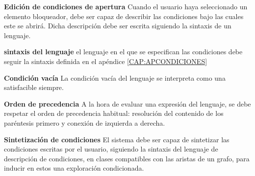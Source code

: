 \item \textbf{Edición de condiciones de apertura}\newline
	Cuando el usuario haya seleccionado un elemento bloqueador, debe ser capaz de describir las condiciones bajo las cuales este se abrirá. Dicha descripción debe ser escrita siguiendo la sintaxis de un lenguaje.
	\begin{functional}
		\item \textbf{sintaxis del lenguaje}\newline
			el lenguaje en el que se especifican las condiciones debe seguir la sintaxis definida en el apéndice \ref{CAP:APCONDICIONES}
		\item \textbf{Condición vacía}\newline
			La condición vacía del lenguaje se interpreta como una satisfacible siempre.
		\item \textbf{Orden de precedencia}\newline
			A la hora de evaluar una expresión del lenguaje, se debe respetar el orden de precedencia habitual: resolución del contenido de los paréntesis primero y conexión de izquierda a derecha.
	\end{functional}
\item \textbf{Sintetización de condiciones}\newline
	El sistema debe ser capaz de sintetizar las condiciones escritas por el usuario, siguiendo la sintaxis del lenguaje de descripción de condiciones, en clases compatibles con las aristas de un grafo, para inducir en estos una exploración condicionada.